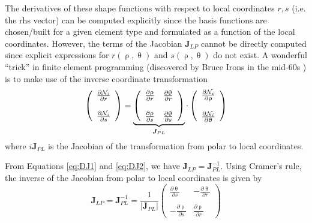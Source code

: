 The derivatives of these shape functions with respect to local coordinates $r,s$ (i.e. the rhs vector)
can be computed explicitly since the basis functions are chosen/built for a given element type and formulated
as a function of the local coordinates.
However, the terms of the Jacobian ${\bm J}_{LP}$ cannot be directly computed since 
explicit expressions for $r(\uprho,\uptheta)$ and $s(\uprho,\uptheta)$ do not exist.
A wonderful ``trick'' in finite element programming (discovered by Bruce Irons in the 
mid-60s \cite{eriz68}) is to make use of the inverse coordinate transformation
\begin{equation}
\left(
\begin{array}{c}
\frac{\partial {\mathcal{N}}_i}{\partial r} \\ \\
\frac{\partial {\mathcal{N}}_i}{\partial s} 
\end{array}
\right)
= 
\underbrace{\left(
\begin{array}{cc}
\frac{\partial \uprho}{\partial r} & \frac{\partial \uptheta}{\partial r} \\ \\
\frac{\partial \uprho}{\partial s} & \frac{\partial \uptheta}{\partial s} 
\end{array}
\right)}_{{\bm J}_{PL}}
\cdot
\left(
\begin{array}{c}
\frac{\partial {\mathcal{N}}_i}{\partial \uprho}  \\ \\
\frac{\partial {\mathcal{N}}_i}{\partial \uptheta}
\end{array}
\right)
\label{eq:DJ2}
\end{equation}
where $i{\bm J}_{PL}$ is the Jacobian of the transformation from polar to local coordinates.

From Equations \eqref{eq:DJ1} and \eqref{eq:DJ2}, we have ${\bm J}_{LP}={\bm J}_{PL}^{-1}$.
Using Cramer's rule, the inverse of the Jacobian from polar to local coordinates is given by
\[
{\bm J}_{LP}={\bm J}_{PL}^{-1} = \frac{1}{|{\bm J}_{PL}|} 
\left(
\begin{array}{cc}
\frac{\partial \uptheta}{\partial s} & -\frac{\partial \uptheta}{\partial r} \\ \\
-\frac{\partial \uprho}{\partial s}  & \frac{\partial \uprho}{\partial r}  
\end{array}
\right)
\]

